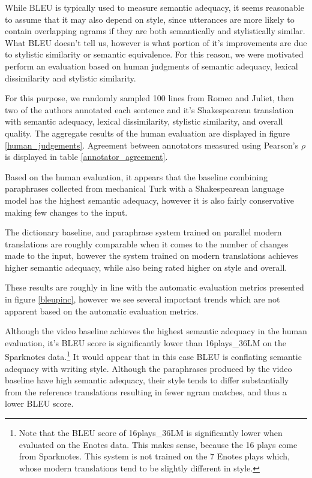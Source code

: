 \documentclass[10pt,a5paper,twoside]{article}
\begin{document}
While BLEU is typically used to measure semantic adequacy, it seems reasonable to assume that it may also depend on style, since utterances
are more likely to contain overlapping ngrams if they are both semantically and stylistically similar.  What BLEU doesn't tell us, however
is what portion of it's improvements are due to stylistic similarity or semantic equivalence.  For this reason, we were motivated perform
an evaluation based on human judgments of semantic adequacy, lexical dissimilarity and stylistic similarity.

For this purpose, we randomly sampled 100 lines from Romeo and Juliet, then two of the authors annotated each sentence and it's Shakespearean
translation with semantic adequacy, lexical dissimilarity, stylistic similarity, and overall quality.
The aggregate results of the human evaluation are displayed in figure \ref{human_judgements}.  Agreement between annotators
measured using Pearson's $\rho$ is displayed in table \ref{annotator_agreement}.

Based on the human evaluation, it appears that the baseline combining paraphrases collected from mechanical Turk \cite{chen11} with
a Shakespearean language model has the highest semantic adequacy, however it is also fairly conservative making few changes to the input.

The dictionary baseline, and paraphrase system trained on parallel modern translations are roughly comparable when it comes to 
the number of changes made to the input, however the system trained on modern translations achieves higher semantic adequacy, while also being rated higher on style and overall.

These results are roughly in line with the automatic evaluation metrics presented in figure \ref{bleupinc}, however we see several important
trends which are not apparent based on the automatic evaluation metrics.

Although the video baseline achieves the highest semantic adequacy in the human evaluation, it's BLEU score
is significantly lower than 16plays\_36LM on the Sparknotes data.\footnote{
Note that the BLEU score of 16plays\_36LM is significantly lower when evaluated on the Enotes data.  This makes sense, because the 
16 plays come from Sparknotes. This system is not trained on the 7 Enotes plays which, whose modern translations tend
to be slightly different in style.}
It would appear that in this case BLEU is conflating semantic adequacy with writing style.  Although the paraphrases produced 
by the video baseline have high semantic adequacy, their style tends to differ substantially from the reference translations resulting
in fewer ngram matches, and thus a lower BLEU score.
\end{document}
